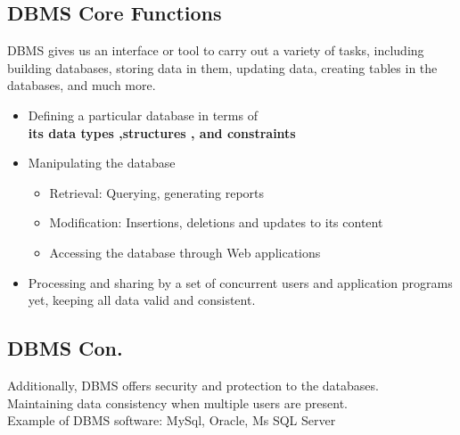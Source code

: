 \documentclass[a4paper, 12pt]{article}
\begin{document}
    \subsection{DBMS Core Functions}
    DBMS gives us an interface or tool to carry out a variety of tasks, including building databases,
    storing data in them, updating data, creating tables in the databases, and much more.
    \begin{itemize}
        \item Defining a particular database in terms of\\
        \textbf{its data types ,structures , and constraints} 
        \item Manipulating the database
        \begin{itemize}
            \item Retrieval: Querying, generating reports
            \item Modification: Insertions, deletions and updates to its content
            \item Accessing the database through Web applications
        \end{itemize}
        \item Processing and sharing by a set of concurrent users and application programs
        yet, keeping all data valid and consistent.
    \end{itemize}

    \subsection{DBMS Con.}
    Additionally, DBMS offers security and protection to the
    databases.\\
    Maintaining data consistency when multiple users are
    present.\\
    Example of DBMS software: MySql, Oracle, Ms SQL Server
\end{document}
